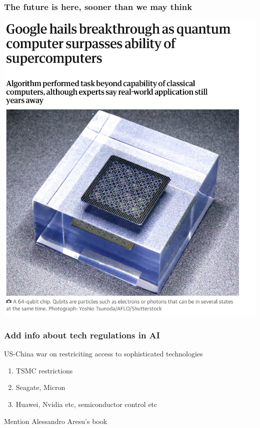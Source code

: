 \documentclass{beamer}
\begin{document}
\begin{frame}
\frametitle{The future is here, sooner than we may think}


\centerline{\includegraphics[width=1.05\linewidth]{figures/figuregoogle.png}}

\end{frame}

\begin{frame}
\frametitle{Add info about tech regulations in AI}
US-China war on restriciting access to sophisticated technologies
\begin{enumerate}
\item TSMC restrictions
\item Seagate, Micron
\item Huawei, Nvidia etc, semiconductor control etc
\end{enumerate}
Mention Alessandro Aresu's book
\end{frame}
\end{document}
